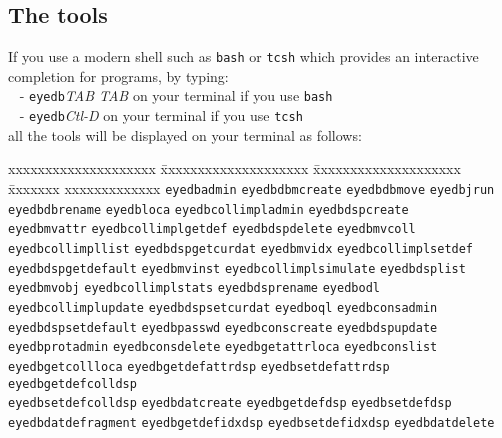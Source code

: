 \subsection{The \eyedb tools}
If you use a modern shell such as \texttt{bash} or \texttt{tcsh}
which provides an interactive completion for programs, by typing:
\\
\mbox{ } - \texttt{eyedb}\emph{TAB TAB} on your terminal if you use \texttt{bash} \\
\mbox{ } - \texttt{eyedb}\emph{Ctl-D} on your terminal if you use \texttt{tcsh} \\
all the \eyedb tools will be displayed on your terminal as follows:
\begin{tabbing}
xxxxxxxxxxxxxxxxxxxx \= xxxxxxxxxxxxxxxxxxxx \= xxxxxxxxxxxxxxxxxxxx \= xxxxxxx
xxxxxxxxxxxxx \kill
\texttt{eyedbadmin} \> \texttt{eyedbdbmcreate} \> \texttt{eyedbdbmove} \> \texttt{eyedbjrun} \\
\texttt{eyedbdbrename} \> \texttt{eyedbloca} \> \texttt{eyedbcollimpladmin} \> \texttt{eyedbdspcreate} \\
\texttt{eyedbmvattr} \> \texttt{eyedbcollimplgetdef} \> \texttt{eyedbdspdelete} \> \texttt{eyedbmvcoll} \\
\texttt{eyedbcollimpllist} \> \texttt{eyedbdspgetcurdat} \> \texttt{eyedbmvidx} \> \texttt{eyedbcollimplsetdef} \\
\texttt{eyedbdspgetdefault} \> \texttt{eyedbmvinst} \> \texttt{eyedbcollimplsimulate} \> \texttt{eyedbdsplist} \\
\texttt{eyedbmvobj} \> \texttt{eyedbcollimplstats} \> \texttt{eyedbdsprename} \> \texttt{eyedbodl} \\
\texttt{eyedbcollimplupdate} \> \texttt{eyedbdspsetcurdat} \> \texttt{eyedboql} \> \texttt{eyedbconsadmin} \\
\texttt{eyedbdspsetdefault} \> \texttt{eyedbpasswd} \> \texttt{eyedbconscreate} \> \texttt{eyedbdspupdate} \\
\texttt{eyedbprotadmin} \> \texttt{eyedbconsdelete} \> \texttt{eyedbgetattrloca} \> \texttt{eyedbconslist} \\
\texttt{eyedbgetcollloca} \> \texttt{eyedbgetdefattrdsp} \> \texttt{eyedbsetdefattrdsp} \> \texttt{eyedbgetdefcolldsp} \\
\texttt{eyedbsetdefcolldsp} \> \texttt{eyedbdatcreate} \> \texttt{eyedbgetdefdsp} \> \texttt{eyedbsetdefdsp} \\
\texttt{eyedbdatdefragment} \> \texttt{eyedbgetdefidxdsp} \> \texttt{eyedbsetdefidxdsp} \> \texttt{eyedbdatdelete} \\

\end{tabbing}
